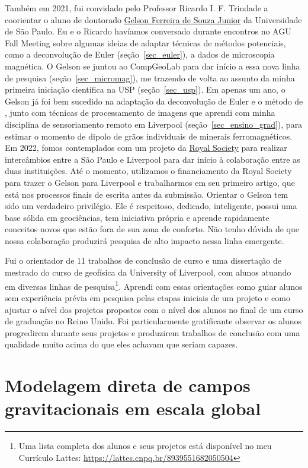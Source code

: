 \documentclass[10pt,a4paper,oneside]{book}
\newcommand{\Lattes}{8939551682050504}
\newcommand{\GelsonLink}{\href{https://www.compgeolab.org/team/\#Souza-junior}{Gelson Ferreira de Souza Junior}}
\begin{document}
Também em 2021, fui convidado pelo Professor Ricardo I. F. Trindade a
coorientar o aluno de doutorado \GelsonLink{} da Universidade de São Paulo.
Eu e o Ricardo havíamos conversado durante encontros no AGU Fall Meeting sobre
algumas ideias de adaptar técnicas de métodos potenciais, como a deconvolução
de Euler (seção~\ref{sec_euler}), a dados de microscopia magnética.
O Gelson se juntou ao CompGeoLab para dar início a essa nova linha de pesquisa
(seção~\ref{sec_micromag}), me trazendo de volta ao assunto da minha primeira
iniciação científica na USP (seção~\ref{sec_usp}).
Em apenas um ano, o Gelson já foi bem sucedido na adaptação da deconvolução de
Euler e o método de \citet{OliveiraJr2015}, junto com técnicas de processamento
de imagens que aprendi com minha disciplina de sensoriamento remoto em
Liverpool (seção~\ref{sec_ensino_grad}), para estimar o momento de dipolo
de grãos individuais de minerais ferromagnéticos.
Em 2022, fomos contemplados com um projeto da
\href{https://royalsociety.org/}{Royal Society} para realizar intercâmbios
entre a São Paulo e Liverpool para dar início à colaboração entre as duas
instituições.
Até o momento, utilizamos o financiamento da Royal Society para trazer o Gelson
para Liverpool e trabalharmos em seu primeiro artigo, que está nos processos
finais de escrita antes da submissão.
Orientar o Gelson tem sido um verdadeiro privilégio.
Ele é respeitoso, dedicado, inteligente, possui uma base sólida em geociências,
tem iniciativa própria e aprende rapidamente conceitos novos que estão fora de
sua zona de conforto.
Não tenho dúvida de que nossa colaboração produzirá pesquisa de alto impacto
nessa linha emergente.

Fui o orientador de 11 trabalhos de conclusão de curso e uma dissertação de
mestrado do curso de geofísica da University of Liverpool, com alunos
atuando em diversas linhas de pesquisa\footnote{Uma lista completa dos alunos
e seus projetos está disponível no meu Currículo Lattes: \url{https://lattes.cnpq.br/\Lattes}}.
Aprendi com essas orientações como guiar alunos sem experiência prévia em
pesquisa pelas etapas iniciais de um projeto e como ajustar o nível dos
projetos propostos com o nível dos alunos no final de um curso de graduação no
Reino Unido.
Foi particularmente gratificante observar os alunos progredirem durante seus
projetos e produzirem trabalhos de conclusão com uma qualidade muito acima do
que eles achavam que seriam capazes.

\section{Modelagem direta de campos gravitacionais em escala global}
\label{sec_modelagemdireta}
\end{document}
